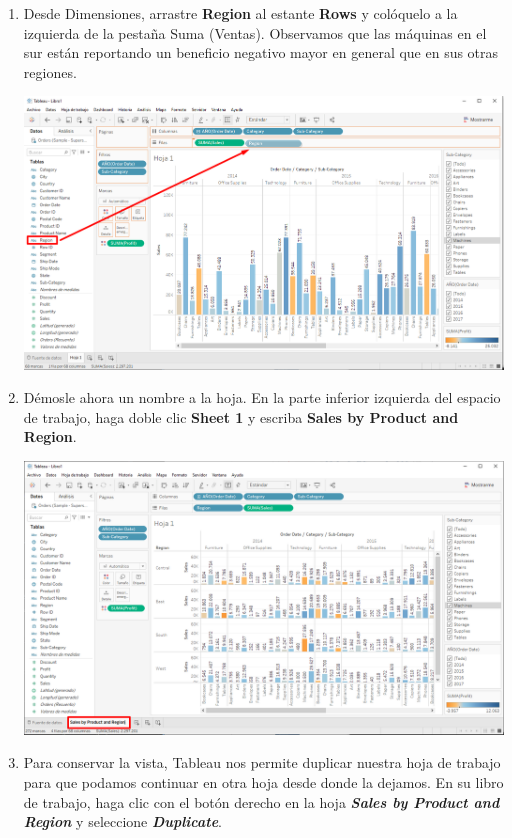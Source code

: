 \documentclass[12pt,letterpaper]{article}
\newcommand\tab[1][1cm]{\hspace*{#1}}
\begin{document}
\begin{enumerate}[\tab 1.]
\begin{center}
        \end{center}
        \item Desde Dimensiones, arrastre {\textbf{Region}} al estante {\textbf{Rows}} y colóquelo a la izquierda de la pestaña Suma (Ventas). Observamos que las máquinas en el sur están reportando un beneficio negativo mayor en general que en sus otras regiones.
        \begin{center}
            \includegraphics[width=15cm]{./img/img24.png}
        \end{center}
        \item Démosle ahora un nombre a la hoja. En la parte inferior izquierda del espacio de trabajo, haga doble clic {\textbf{Sheet 1}} y escriba {\textbf{Sales by Product and Region}}.
        \begin{center}
            \includegraphics[width=15cm]{./img/img25.png}
        \end{center}
        \item Para conservar la vista, Tableau nos permite duplicar nuestra hoja de trabajo para que podamos continuar en otra hoja desde donde la dejamos. En su libro de trabajo, haga clic con el botón derecho en la hoja \textit{\textbf{Sales by Product and Region}} y seleccione \textit{\textbf{Duplicate}}.

\end{enumerate}
\end{document}
